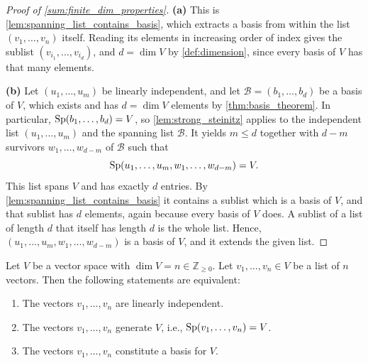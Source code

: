 \begin{proof}[Proof of \cref{sum:finite_dim_properties}]
\textbf{(a)} This is \cref{lem:spanning_list_contains_basis}, which extracts a basis from within the list $(v_1, \dots, v_n)$ itself. Reading its elements in increasing order of index gives the sublist $(v_{i_1}, \dots, v_{i_d})$, and $d = \dim V$ by \cref{def:dimension}, since every basis of $V$ has that many elements.

\textbf{(b)} Let $(u_1, \dots, u_m)$ be linearly independent, and let $\mathcal{B} = (b_1, \dots, b_d)$ be a basis of $V$, which exists and has $d = \dim V$ elements by \cref{thm:basis_theorem}. In particular, $\operatorname{Sp}(b_1, \dots, b_d) = V$, so \cref{lem:strong_steinitz} applies to the independent list $(u_1, \dots, u_m)$ and the spanning list $\mathcal{B}$. It yields $m \le d$ together with $d - m$ survivors $w_1, \dots, w_{d-m}$ of $\mathcal{B}$ such that
\[
\operatorname{Sp}(u_1, \dots, u_m, w_1, \dots, w_{d-m}) = V.
\]
This list spans $V$ and has exactly $d$ entries. By \cref{lem:spanning_list_contains_basis} it contains a sublist which is a basis of $V$, and that sublist has $d$ elements, again because every basis of $V$ does. A sublist of a list of length $d$ that itself has length $d$ is the whole list. Hence, $(u_1, \dots, u_m, w_1, \dots, w_{d-m})$ is a basis of $V$, and it extends the given list.
\end{proof}

\begin{theorem}
\label{thm:basis_equivalent_characterizations}
Let $V$ be a vector space with $\dim V = n \in \mathbb{Z}_{\ge 0}$. Let $v_1, \dots, v_n \in V$ be a list of $n$ vectors. Then the following statements are equivalent:
\begin{enumerate}[label=\textbf{(\alph*)}]
    \item The vectors $v_1, \dots, v_n$ are linearly independent.
    \item The vectors $v_1, \dots, v_n$ generate $V$, i.e., $\operatorname{Sp}(v_1, \dots, v_n) = V$.
    \item The vectors $v_1, \dots, v_n$ constitute a basis for $V$.
\end{enumerate}
\end{theorem}

